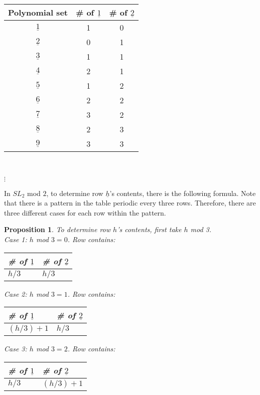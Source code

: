 \documentclass[a4paper,draft]{amsproc}
\theoremstyle{plain}
\newtheorem{prop}{Proposition}[section]
\theoremstyle{definition}
\theoremstyle{remark}
\numberwithin{equation}{section}
\begin{document}
\begin{table}[h]
    \begin{tabular}{|c|c|c|} 
	\hline
    Polynomial set & \# of $\underline{1}$ & \# of $\underline{2}$ \\ \hline
    $\underline{1}$ & 1 & 0 \\ \hline
    $\underline{2}$ & 0 & 1 \\ \hline
    $\underline{3}$ & 1 & 1 \\ \hline
    $\underline{4}$ & 2 & 1 \\ \hline
    $\underline{5}$ & 1 & 2 \\ \hline
    $\underline{6}$ & 2 & 2 \\ \hline
    $\underline{7}$ & 3 & 2 \\ \hline
    $\underline{8}$ & 2 & 3 \\ \hline
    $\underline{9}$ & 3 & 3 \\ \hline
    \end{tabular} \\
\begin{centering}$\vdots$\end{centering}
\end{table} 

In $SL_{2}$ mod $2$, to determine row $\underline{h}$'s contents, there is the following formula. Note that there is a pattern in the table periodic every three rows. Therefore, there are three different cases for each row within the pattern.
\begin{prop}
To determine row $h$'s contents, first take $h$ mod 3. \\
Case 1: $h$ mod $3 = 0$. Row contains: 
\begin{table}[h]
\centering
    \begin{tabular}{|l|l|}
    \hline
    \# of $\underline{1}$ & \# of $\underline{2}$ \\ \hline
    $h/3$     & $h/3$     \\ \hline
    \end{tabular}
\end{table}

Case 2: $h$ mod $3 = 1$. Row contains: 
\begin{table}[h]
\centering
    \begin{tabular}{|l|l|}
    \hline
    \# of $\underline{1}$ & \# of $\underline{2}$ \\ \hline
    $(h/3) + 1$     & $h/3$     \\ \hline
    \end{tabular}
\end{table}

Case 3: $h$ mod $3 = 2$. Row contains: 
\begin{table}[h]
\centering
    \begin{tabular}{|l|l|}
    \hline
    \# of $\underline{1}$ & \# of $\underline{2}$ \\ \hline
    $h/3$     & $(h/3) + 1$     \\ \hline
    \end{tabular}
\end{table}

\end{prop}
\end{document}

